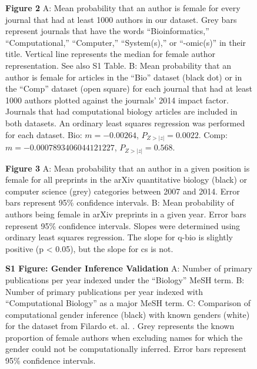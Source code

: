 \documentclass[10pt,letterpaper]{article}
\begin{document}
\begin{flushleft}
\begin{figure}[!h]
  \caption{{\bf Figure 2}
  A: Mean probability that an author is female for every journal that had at least 1000 authors in our dataset. Grey bars represent journals that have the words “Bioinformatics,” “Computational,” “Computer,” “System(s),” or “-omic(s)” in their title. Vertical line represents the median for female author representation. See also S1 Table. B: Mean probability that an author is female for articles in the “Bio” dataset (black dot) or in the “Comp” dataset (open square) for each journal that had at least 1000 authors plotted against the journals’ 2014 impact factor. Journals that had computational biology articles are included in both datasets. An ordinary least squares regression was performed for each dataset. Bio: $m = -0.00264$, $P_{Z>|z|} = 0.0022$. Comp: $m = -0.0007893406044121227$, $P_{Z>|z|} = 0.568$.}
  \label{fig2}
\end{figure}

\begin{figure}[!h]
  \caption{{\bf Figure 3}
  A: Mean probability that an author in a given position is female for all preprints in the arXiv quantitative biology (black) or computer science (grey) categories between 2007 and 2014. Error bars represent 95\% confidence intervals. B: Mean probability of authors being female in arXiv preprints in a given year. Error bars represent 95\% confidence intervals. Slopes were determined using ordinary least squares regression. The slope for q-bio is slightly positive (p < 0.05), but the slope for cs is not.}
  \label{fig3}
\end{figure}

\begin{figure}[!h]
  \caption{{\bf S1 Figure: Gender Inference Validation}
  A: Number of primary publications per year indexed under the “Biology” MeSH term. B: Number of primary publications per year indexed with “Computational Biology” as a major MeSH term. C: Comparison of computational gender inference (black) with known genders (white) for the dataset from Filardo et. al. \cite{Filardo2016}. Grey represents the known proportion of female authors when excluding names for which the gender could not be computationally inferred. Error bars represent 95\% confidence intervals.}
  \label{figS1}
\end{figure}


\end{flushleft}
\end{document}
